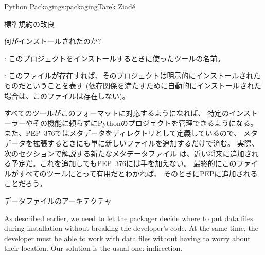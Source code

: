 \begin{aosachapter}{Python Packaging}{s:packaging}{Tarek Ziad\'{e}}
\begin{aosasect1}{標準規約の改良}
\begin{aosasect2}{何がインストールされたのか?}
\begin{aosaitemize}
  \item {}: このプロジェクトをインストールするときに使ったツールの名前。

  \item {}: このファイルが存在すれば、そのプロジェクトは明示的にインストールされたものだということを表す
             (依存関係を満たすために自動的にインストールされた場合は、このファイルは存在しない)。

\end{aosaitemize}

\noindent
すべてのツールがこのフォーマットに対応するようになれば、
特定のインストーラーやその機能に頼らずにPythonのプロジェクトを管理できるようになる。
また、PEP~376ではメタデータをディレクトリとして定義しているので、
メタデータを拡張するときにも単に新しいファイルを追加するだけで済む。
実際、次のセクションで解説する新たなメタデータファイル
は、近い将来に追加される予定だ。これを追加してもPEP~376には手を加えない。
最終的にこのファイルがすべてのツールにとって有用だとわかれば、
そのときにPEPに追加されることだろう。

\end{aosasect2}

\begin{aosasect2}{データファイルのアーキテクチャ}

As described earlier, we need to let the packager decide where to put
data files during installation without breaking the developer's
code. At the same time, the developer must be able to work with data
files without having to worry about their location.  Our solution is
the usual one: indirection.


\end{aosasect2}
\end{aosasect1}
\end{aosachapter}
